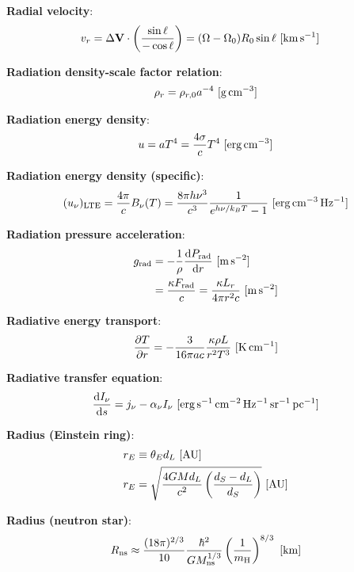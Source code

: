 \documentclass[a4paper,10pt]{article}
\begin{document}
{\noindent}\textbf{Radial velocity}:
\begin{align*}
    v_r &= \Delta\mathbf{V}\cdot\left(\frac{\sin\ell}{-\cos\ell}\right) = (\Omega-\Omega_0)R_0\sin\ell ~ [{\rm km\,s^{-1}}]
\end{align*}

{\noindent}\textbf{Radiation density-scale factor relation}:
\begin{align*}
    \rho_r = \rho_{r,0}a^{-4} ~ [{\rm g\,cm^{-3}}]
\end{align*}

{\noindent}\textbf{Radiation energy density}:
\begin{align*}
    u = aT^4 = \frac{4\sigma}{c}T^4 ~ [{\rm erg\,cm^{-3}}]
\end{align*}

{\noindent}\textbf{Radiation energy density (specific)}:
\begin{align*}
    (u_\nu)_{\rm LTE} = \frac{4\pi}{c}B_\nu(T) = \frac{8\pi h\nu^3}{c^3}\frac{1}{e^{h\nu/k_BT}-1} ~ [{\rm erg\,cm^{-3}\,Hz^{-1}}]
\end{align*}

{\noindent}\textbf{Radiation pressure acceleration}:
\begin{align*}
    g_{\rm rad} &= -\frac{1}{\rho} \frac{{\rm d}P_{\rm rad}}{{\rm d}r} ~ [{\rm m\,s^{-2}}] \\
    &= \frac{\kappa F_{\rm rad}}{c} = \frac{\kappa L_r}{4\pi r^2c} ~ [{\rm m\,s^{-2}}]
\end{align*}

{\noindent}\textbf{Radiative energy transport}:
\begin{align*}
    \frac{\partial T}{\partial r} = - \frac{3}{16\pi ac} \frac{\kappa\rho L}{r^2T^3} ~ [{\rm K\,cm^{-1}}]
\end{align*}

{\noindent}\textbf{Radiative transfer equation}:
\begin{align*}
    \frac{\mathrm{d}I_\nu}{\mathrm{d}s} = j_\nu - \alpha_\nu I_\nu ~ [{\rm erg\,s^{-1}\,cm^{-2}\,Hz^{-1}\,sr^{-1}\,pc^{-1}}]
\end{align*}

{\noindent}\textbf{Radius (Einstein ring)}:
\begin{align*}
    r_E &\equiv \theta_E d_L ~ [{\rm AU}] \\
    r_E &= \sqrt{\frac{4GMd_L}{c^2} \left(\frac{d_S-d_L}{d_S}\right)} ~ [{\rm AU}]
\end{align*}

{\noindent}\textbf{Radius (neutron star)}:
\begin{align*}
    R_{\rm ns} \approx \frac{(18\pi)^{2/3}}{10} \frac{\hbar^2}{GM_{\rm ns}^{1/3}} \left(\frac{1}{m_{\rm H}}\right)^{8/3} ~ [{\rm km}]
\end{align*}
\end{document}
